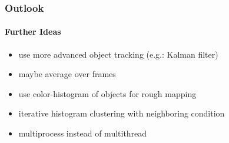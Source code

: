 \documentclass[]{beamer}
\begin{document}
\begin{frame}
    \frametitle{Outlook}
    \framesubtitle{Further Ideas}
    \begin{itemize}
        \item<+-> use more advanced object tracking (e.g.: Kalman filter)
        \item<+-> maybe average over frames
        \item<+-> use color-histogram of objects for rough mapping
        \item<+-> iterative histogram clustering with neighboring condition
        \item<+-> multiprocess instead of multithread        
    \end{itemize}
\end{frame}

\end{document}
